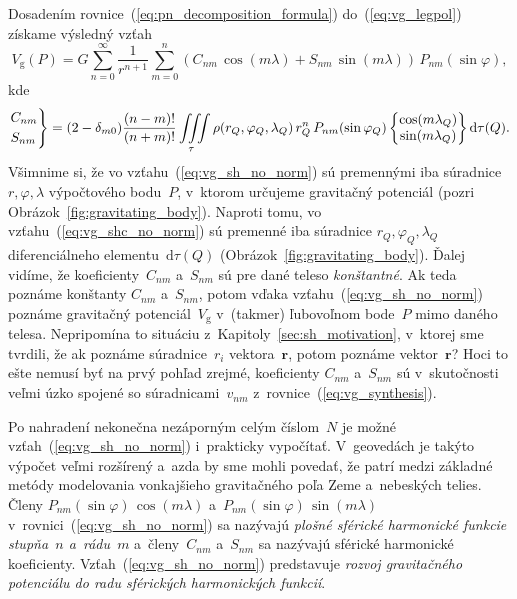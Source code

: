 \documentclass[a4paper, 12pt]{book}
\newcommand{\diff}{\mathrm d}
\newcommand{\gidx}{\mathrm g}
\let\vec\mathbf
\begin{document}
Dosadením rovnice~(\ref{eq:pn_decomposition_formula}) do~(\ref{eq:vg_legpol})
získame výsledný vzťah
%
\begin{equation}
\label{eq:vg_sh_no_norm}
V_\gidx(P) = G \sum_{n = 0}^\infty \frac{1}{r^{n + 1}} \sum_{m = 0}^{n} \left(
C_{nm} \, \cos(m\lambda) + S_{nm} \, \sin(m\lambda)\right) \,
P_{nm}(\sin\varphi){,}
\end{equation}
%
kde
%
\begin{equation}
\label{eq:vg_shc_no_norm}
\begin{rcases}
C_{nm}\\
S_{nm}
\end{rcases}
= (2 - \delta_{m0}) \frac{(n - m)!}{(n + m)!} \iiint\limits_{\tau} \rho(r_Q,
\varphi_Q, \lambda_Q) \, r_Q^n \, P_{nm}(\sin\varphi_Q)
%
\begin{Bmatrix}
\cos(m\lambda_Q)\\
\sin(m\lambda_Q)
\end{Bmatrix}
%
\diff\tau(Q){.}
\end{equation}
%
Všimnime si, že vo vzťahu~(\ref{eq:vg_sh_no_norm}) sú premennými iba súradnice 
$r, \varphi, \lambda$ výpočtového bodu~$P$, v~ktorom určujeme gravitačný 
potenciál (pozri Obrázok~\ref{fig:gravitating_body}).  Naproti tomu, vo 
vzťahu~(\ref{eq:vg_shc_no_norm}) sú premenné iba súradnice $r_Q,\varphi_Q, 
\lambda_Q$ diferenciálneho elementu~$\diff\tau(Q)$ 
(Obrázok~\ref{fig:gravitating_body}).  Ďalej vidíme, že koeficienty~$C_{nm}$ 
a~$S_{nm}$ sú pre dané teleso \emph{konštantné}.  Ak teda poznáme konštanty 
$C_{nm}$ a~$S_{nm}$, potom vďaka vzťahu~(\ref{eq:vg_sh_no_norm}) poznáme 
gravitačný potenciál~$V_\gidx$ v~(takmer) ľubovoľnom bode~$P$ mimo daného 
telesa.  Nepripomína to situáciu z~Kapitoly~\ref{sec:sh_motivation}, v~ktorej 
sme tvrdili, že ak poznáme súradnice~$r_i$ vektora~$\vec r$, potom poznáme 
vektor~$\vec r$?  Hoci to ešte nemusí byť na prvý pohľad zrejmé, koeficienty 
$C_{nm}$ a~$S_{nm}$ sú v~skutočnosti veľmi úzko spojené so súradnicami~$v_{nm}$ 
z~rovnice~(\ref{eq:vg_synthesis}).

Po nahradení nekonečna nezáporným celým číslom~$N$ je možné 
vzťah~(\ref{eq:vg_sh_no_norm}) i~prakticky vypočítať.  V~geovedách je takýto
výpočet veľmi rozšírený a~azda by sme mohli povedať, že patrí medzi základné  
metódy modelovania vonkajšieho
gravitačného poľa Zeme a~nebeských telies.  Členy $P_{nm}(\sin\varphi) \,
\cos(m\lambda)$ a~$ P_{nm}(\sin\varphi) \, \sin(m\lambda)$
v~rovnici~(\ref{eq:vg_sh_no_norm}) sa nazývajú \emph{plošné sférické harmonické
funkcie stupňa~$n$ a~rádu~$m$} a~členy~$C_{nm}$ a~$S_{nm}$ sa nazývajú sférické
harmonické koeficienty.  Vzťah~(\ref{eq:vg_sh_no_norm}) predstavuje
\emph{rozvoj gravitačného potenciálu do radu sférických harmonických funkcií}.
\end{document}
